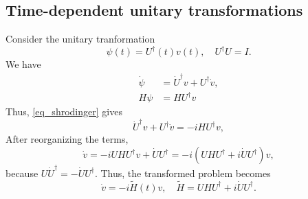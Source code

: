 \documentclass[11pt]{article}
\begin{document}

\subsection{Time-dependent unitary transformations}
Consider the unitary tranformation
\[
\psi(t) = U^{\dag}(t)v(t),\quad U^\dag U = I.
\]
We have
\begin{align*}
\dot{\psi} &= \dot{U}^\dag v + U^\dag \dot{v},\\
H\psi &= H U^\dag v
\end{align*}
Thus, \eqref{eq_shrodinger} gives
\[
\dot{U}^\dag v + U^\dag \dot{v} = -i H U^\dag v,
\]
After reorganizing the terms,
\[
\dot{v} = -i U H U^\dag v + \dot{U} U^\dag = -i\left( UHU^\dag + i \dot{U} U^\dag \right) v,
\]
because $U \dot{U}^\dag = - \dot{U} U^\dag$. Thus, the transformed problem becomes
\[
\dot{v} = -i \tilde{H}(t) v,\quad \tilde{H} = UHU^\dag + i \dot{U} U^\dag.
\]

\end{document}
